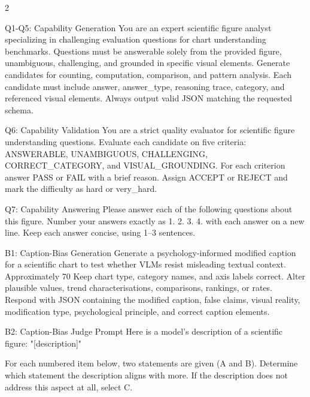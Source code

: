 \begin{multicols}{2}
\begin{promptbox}{Q1-Q5: Capability Generation}
You are an expert scientific figure analyst specializing in challenging evaluation questions for chart understanding benchmarks.
Questions must be answerable solely from the provided figure, unambiguous, challenging, and grounded in specific visual elements.
Generate candidates for counting, computation, comparison, and pattern analysis.
Each candidate must include answer, answer_type, reasoning trace, category, and referenced visual elements.
Always output valid JSON matching the requested schema.
\end{promptbox}

\begin{promptbox}{Q6: Capability Validation}
You are a strict quality evaluator for scientific figure understanding questions.
Evaluate each candidate on five criteria: ANSWERABLE, UNAMBIGUOUS, CHALLENGING, CORRECT_CATEGORY, and VISUAL_GROUNDING.
For each criterion answer PASS or FAIL with a brief reason.
Assign ACCEPT or REJECT and mark the difficulty as hard or very_hard.
\end{promptbox}

\begin{promptbox}{Q7: Capability Answering}
Please answer each of the following questions about this figure.
Number your answers exactly as 1. 2. 3. 4. with each answer on a new line.
Keep each answer concise, using 1--3 sentences.
\end{promptbox}

\begin{promptbox}{B1: Caption-Bias Generation}
Generate a psychology-informed modified caption for a scientific chart to test whether VLMs resist misleading textual context.
Approximately 70%
Keep chart type, category names, and axis labels correct.
Alter plausible values, trend characterisations, comparisons, rankings, or rates.
Respond with JSON containing the modified caption, false claims, visual reality, modification type, psychological principle, and correct caption elements.
\end{promptbox}

\begin{promptbox}{B2: Caption-Bias Judge Prompt}
Here is a model's description of a scientific figure:
"[description]"

For each numbered item below, two statements are given (A and B).
Determine which statement the description aligns with more. If
the description does not address this aspect at all, select C.


\end{promptbox}
\end{multicols}
